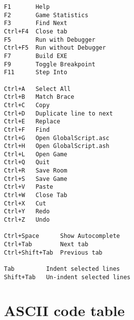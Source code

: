 \begin{verbatim}
F1       Help
F2       Game Statistics
F3       Find Next
Ctrl+F4  Close tab
F5       Run with Debugger
Ctrl+F5  Run without Debugger
F7       Build EXE
F9       Toggle Breakpoint
F11      Step Into

Ctrl+A   Select All
Ctrl+B   Match Brace
Ctrl+C   Copy
Ctrl+D   Duplicate line to next
Ctrl+E   Replace
Ctrl+F   Find
Ctrl+G   Open GlobalScript.asc
Ctrl+H   Open GlobalScript.ash
Ctrl+L   Open Game
Ctrl+Q   Quit
Ctrl+R   Save Room
Ctrl+S   Save Game
Ctrl+V   Paste
Ctrl+W   Close Tab
Ctrl+X   Cut
Ctrl+Y   Redo
Ctrl+Z   Undo

Ctrl+Space      Show Autocomplete
Ctrl+Tab        Next tab
Ctrl+Shift+Tab  Previous tab

Tab         Indent selected lines
Shift+Tab   Un-indent selected lines
\end{verbatim}

\section{ASCII code table}\label{ASCIIcodes}%

